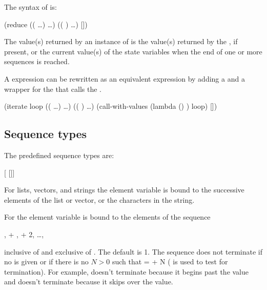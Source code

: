 The syntax of  is:
\begin{example}
  (reduce ((   \ldots)
            \ldots)
           (( )
            \ldots)
    [])
\end{example}

The value(s) returned by an instance of  is the value(s) returned
 by the , if present, or the current value(s) of the state
variables when the end of one or more sequences is reached.

A  expression can be rewritten as an equivalent 
 expression by adding a  and a wrapper for the
  that calls the .
\begin{example}
(iterate loop
         ((   \ldots)
          \ldots)
         (( )
          \ldots)
  (call-with-values (lambda ()
                      )
                    loop)
  [])
\end{example}

\subsection{Sequence types}

The predefined sequence types are:
\begin{protos}
 {   [ []]}
 {   }
 {   }
\end{protos}

For lists, vectors, and strings the element variable is bound to the
 successive elements of the list or vector, or the characters in the
 string.

For  the element variable is bound to the elements of the sequence
\begin{example}
 ,  + ,  + 2, \ldots, 
\end{example}
 inclusive of  and exclusive of .
The default  is 1.
The sequence does not terminate if no  is given or if there
 is no $N > 0$ such that  =  + N
 (\code{=} is used to test for termination).
For example,  doesn't terminate
 because it begins past the  value and  doesn't
 terminate because it skips over the  value.

